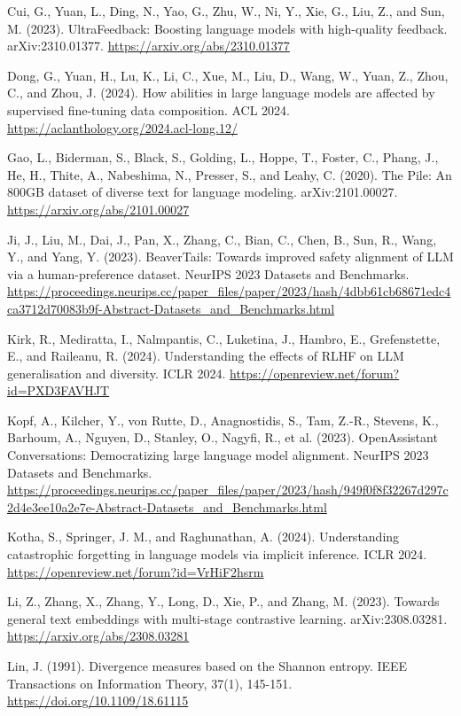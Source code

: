 \documentclass[11pt]{article}
\begin{document}
Cui, G., Yuan, L., Ding, N., Yao, G., Zhu, W., Ni, Y., Xie, G., Liu, Z., and Sun, M. (2023). UltraFeedback: Boosting language models with high-quality feedback. arXiv:2310.01377. \url{https://arxiv.org/abs/2310.01377}

Dong, G., Yuan, H., Lu, K., Li, C., Xue, M., Liu, D., Wang, W., Yuan, Z., Zhou, C., and Zhou, J. (2024). How abilities in large language models are affected by supervised fine-tuning data composition. ACL 2024. \url{https://aclanthology.org/2024.acl-long.12/}

Gao, L., Biderman, S., Black, S., Golding, L., Hoppe, T., Foster, C., Phang, J., He, H., Thite, A., Nabeshima, N., Presser, S., and Leahy, C. (2020). The Pile: An 800GB dataset of diverse text for language modeling. arXiv:2101.00027. \url{https://arxiv.org/abs/2101.00027}

Ji, J., Liu, M., Dai, J., Pan, X., Zhang, C., Bian, C., Chen, B., Sun, R., Wang, Y., and Yang, Y. (2023). BeaverTails: Towards improved safety alignment of LLM via a human-preference dataset. NeurIPS 2023 Datasets and Benchmarks. \url{https://proceedings.neurips.cc/paper_files/paper/2023/hash/4dbb61cb68671edc4ca3712d70083b9f-Abstract-Datasets_and_Benchmarks.html}

Kirk, R., Mediratta, I., Nalmpantis, C., Luketina, J., Hambro, E., Grefenstette, E., and Raileanu, R. (2024). Understanding the effects of RLHF on LLM generalisation and diversity. ICLR 2024. \url{https://openreview.net/forum?id=PXD3FAVHJT}

Kopf, A., Kilcher, Y., von Rutte, D., Anagnostidis, S., Tam, Z.-R., Stevens, K., Barhoum, A., Nguyen, D., Stanley, O., Nagyfi, R., et al. (2023). OpenAssistant Conversations: Democratizing large language model alignment. NeurIPS 2023 Datasets and Benchmarks. \url{https://proceedings.neurips.cc/paper_files/paper/2023/hash/949f0f8f32267d297c2d4e3ee10a2e7e-Abstract-Datasets_and_Benchmarks.html}

Kotha, S., Springer, J. M., and Raghunathan, A. (2024). Understanding catastrophic forgetting in language models via implicit inference. ICLR 2024. \url{https://openreview.net/forum?id=VrHiF2hsrm}

Li, Z., Zhang, X., Zhang, Y., Long, D., Xie, P., and Zhang, M. (2023). Towards general text embeddings with multi-stage contrastive learning. arXiv:2308.03281. \url{https://arxiv.org/abs/2308.03281}

Lin, J. (1991). Divergence measures based on the Shannon entropy. IEEE Transactions on Information Theory, 37(1), 145-151. \url{https://doi.org/10.1109/18.61115}
\end{document}
